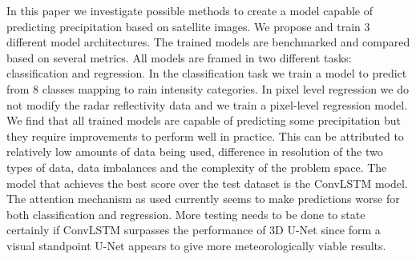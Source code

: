 In this paper we investigate possible methods to create a model capable of
predicting precipitation based on satellite images.
We propose and train 3 different model architectures. The trained models are benchmarked and compared based on several metrics.
All models are framed in two different tasks: classification and regression.
In the classification task we train a model to predict from 8 classes mapping to rain intensity categories. In pixel level regression we do not modify the 
radar reflectivity data and we train a pixel-level regression model.
We find that all trained models are capable of predicting some precipitation but they require improvements to perform well in practice.
This can be attributed to relatively low amounts of data being used, difference in resolution
of the two types of data, data imbalances and the complexity of the problem space. 
The model that achieves the best score over the test dataset is the ConvLSTM model. The attention mechanism
as used currently seems to make predictions worse for both classification and regression. More testing needs to be done to state certainly if ConvLSTM surpasses
the performance of 3D U-Net since form a visual standpoint U-Net appears to give more meteorologically viable results.